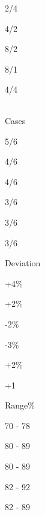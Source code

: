 \documentclass[11pt]{article}
\begin{document}
2/4

\textbar{}

4/2

\textbar{}

8/2

\textbar{}

8/1

\textbar{}

4/4

\begin{longtable}[]{@{}lllllll@{}}
\toprule
\bottomrule
\end{longtable}

\textbar{}

Cases

\textbar{}

5/6

\textbar{}

4/6

\textbar{}

4/6

\textbar{}

3/6

\textbar{}

3/6

\textbar{}

3/6

\textbar{} \textbar{}

Deviation

\textbar{}

+4\%

\textbar{}

+2\%

\textbar{}

-2\%

\textbar{}

-3\%

\textbar{}

+2\%

\textbar{}

+1

\textbar{} \textbar{}

Range\%

\textbar{}

70 - 78

\textbar{}

80 - 89

\textbar{}

80 - 89

\textbar{}

82 - 92

\textbar{}

82 - 89
\end{document}
